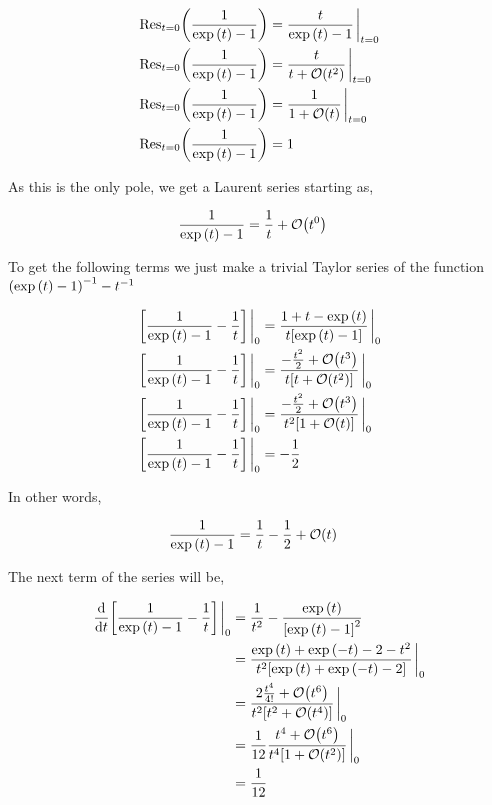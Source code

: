 \begin{align*}
    \textnormal{Res}_{t=0}\qty(\frac{1}{\exp\qty(t)-1})&=\frac{t}{\exp\qty(t)-1}\eval_{t=0}\\
    \textnormal{Res}_{t=0}\qty(\frac{1}{\exp\qty(t)-1})&=\frac{t}{t+\mathcal O\qty(t^2)}\eval_{t=0}\\
    \textnormal{Res}_{t=0}\qty(\frac{1}{\exp\qty(t)-1})&=\frac{1}{1+\mathcal O\qty(t)}\eval_{t=0}\\
    \textnormal{Res}_{t=0}\qty(\frac{1}{\exp\qty(t)-1})&=1
\end{align*}

As this is the only pole, we get a Laurent series starting as,

\begin{align*}
    \frac{1}{\exp\qty(t)-1}&=\frac1t+\mathcal O\qty(t^0)
\end{align*}

To get the following terms we just make a trivial Taylor series of the function $\qty(\exp\qty(t)-1)^{-1}-t^{-1}$

\begin{align*}
    \qty[\frac{1}{\exp\qty(t)-1}-\frac1t]\eval_0&=\frac{1+t-\exp\qty(t)}{t\qty[\exp\qty(t)-1]}\eval_0\\
    \qty[\frac{1}{\exp\qty(t)-1}-\frac1t]\eval_0&=\frac{-\frac{t^2}{2}+\mathcal O\qty(t^3)}{t\qty[t+\mathcal O\qty(t^2)]}\eval_0\\
    \qty[\frac{1}{\exp\qty(t)-1}-\frac1t]\eval_0&=\frac{-\frac{t^2}{2}+\mathcal O\qty(t^3)}{t^2\qty[1+\mathcal O\qty(t)]}\eval_0\\
    \qty[\frac{1}{\exp\qty(t)-1}-\frac1t]\eval_0&=-\frac12
\end{align*}

In other words,

\begin{align*}
    \frac{1}{\exp\qty(t)-1}&=\frac1t-\frac12+\mathcal O\qty(t)
\end{align*}

The next term of the series will be,

\begin{align*}
    \dv{}{t}\qty[\frac{1}{\exp\qty(t)-1}-\frac1t]\eval_0&=\frac{1}{t^2}-\frac{\exp\qty(t)}{\qty[\exp\qty(t)-1]^2}\\
    &=\frac{\exp\qty(t)+\exp\qty(-t)-2-t^2}{t^2\qty[\exp\qty(t)+\exp\qty(-t)-2]}\eval_0\\
    &=\frac{2\frac{t^4}{4!}+\mathcal O\qty(t^6)}{t^2\qty[t^2+\mathcal O\qty(t^4)]}\eval_0\\
    &=\frac{1}{12}\frac{t^4+\mathcal O\qty(t^6)}{t^4\qty[1+\mathcal O\qty(t^2)]}\eval_0\\
    &=\frac{1}{12}
\end{align*}

